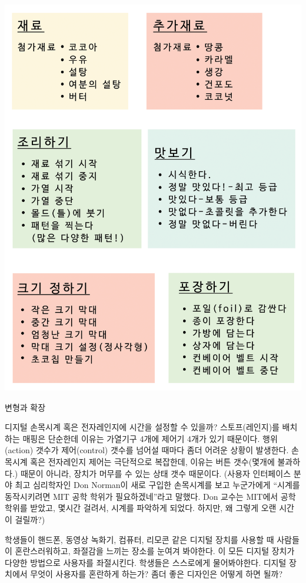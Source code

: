 \documentclass[]{article}
\begin{document}
\includegraphics{csunplugged/06-part/img/ch20-hci/19-hci-07-icon-cards.png}

변형과 확장

디지털 손목시계 혹은 전자레인지에 시간을 설정할 수 있을까?
스토프(레인지)를 배치하는 매핑은 단순한데 이유는 가열기구 4개에 제어기
4개가 있기 때문이다. 행위(action) 갯수가 제어(control) 갯수를 넘어설
때마다 좀더 어려운 상황이 발생한다. 손목시계 혹은 전자레인지 제어는
극단적으로 복잡한데, 이유는 버튼 갯수(몇개에 불과하다.) 때문이 아니라,
장치가 머무를 수 있는 상태 갯수 때문이다. (사용자 인터페이스 분야 최고
심리학자인 Don Norman이 새로 구입한 손목시계를 보고 누군가에게 ``시계를
동작시키려면 MIT 공학 학위가 필요하겠네''라고 말했다. Don 교수는 MIT에서
공학 학위를 받았고, 몇시간 걸려서, 시계를 파악하게 되었다. 하지만, 왜
그렇게 오랜 시간이 걸릴까?)

학생들이 핸드폰, 동영상 녹화기, 컴퓨터, 리모콘 같은 디지털 장치를 사용할
때 사람들이 혼란스러워하고, 좌절감을 느끼는 장소를 눈여겨 봐야한다. 이
모든 디지털 장치가 다양한 방법으로 사용자를 좌절시킨다. 학생들은
스스로에게 물어봐야한다. 디지털 장치에서 무엇이 사용자를 혼란하게
하는가? 좀더 좋은 디자인은 어떻게 하면 될까?
\end{document}
